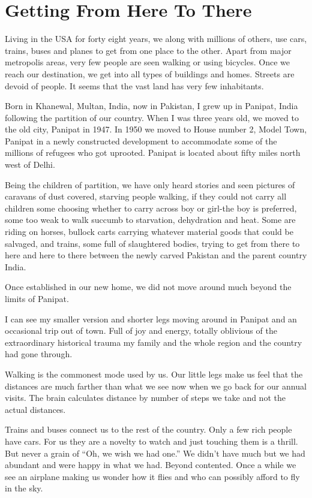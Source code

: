 \chapter{Getting From Here To There}
Living in the USA for forty eight years, we along with millions of others,
use cars, trains, buses and planes to get from one place to the other.
Apart from major metropolis areas, very few people are seen walking or
using bicycles. Once we reach our destination, we get into all types of
buildings and homes. Streets are devoid of people. It seems that the vast
land has very few inhabitants.

Born in Khanewal, Multan, India, now in Pakistan, I grew up in Panipat,
India following the partition of our country. When I was three years old,
we moved to the old city, Panipat in 1947. In 1950 we moved to House
number 2, Model Town, Panipat in a newly constructed development to
accommodate some of the millions of refugees who got uprooted. Panipat is
located about fifty miles north west of Delhi.

Being the children of partition, we have only heard stories and seen
pictures of caravans of dust covered, starving people walking, if they
could not carry all children some choosing whether to carry across boy or
girl-the boy is preferred, some too weak to walk succumb to starvation,
dehydration and heat. Some are riding on horses, bullock carts carrying
whatever material goods that could be salvaged, and trains, some full of
slaughtered bodies, trying to get from there to here and here to there
between the newly carved Pakistan and the parent country India.

Once established in our new home, we did not move around much beyond the
limits of Panipat.

I can see my smaller version and shorter legs moving around in Panipat and
an occasional trip out of town. Full of joy and energy, totally oblivious
of the extraordinary historical trauma my family and the whole region and
the country had gone through.

Walking is the commonest mode used by us. Our little legs make us feel
that the distances are much farther than what we see now when we go back
for our annual visits. The brain calculates distance by number of steps we
take and not the actual distances.

Trains and buses connect us to the rest of the country. Only a few rich
people have cars. For us they are a novelty to watch and just touching
them is a thrill. But never a grain of “Oh, we wish we had one.” We didn’t
have much but we had abundant and were happy in what we had. Beyond
contented. Once a while we see an airplane making us wonder how it flies
and who can possibly afford to fly in the sky.

